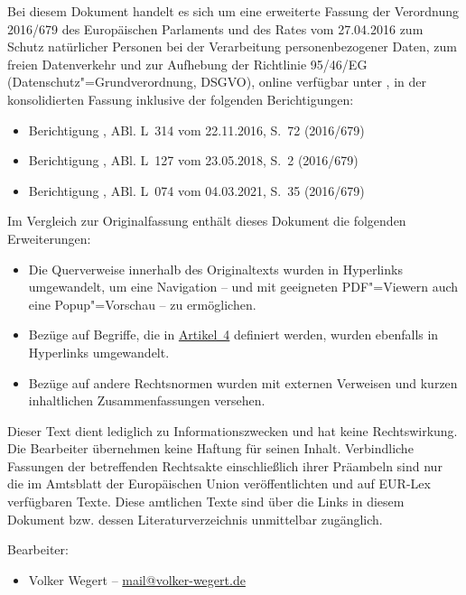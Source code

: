 
Bei diesem Dokument handelt es sich um eine erweiterte Fassung der Verordnung 2016/679 des Europäischen Parlaments und
des Rates vom 27.04.2016 zum Schutz natürlicher Personen bei der Verarbeitung personenbezogener Daten, zum freien
Datenverkehr und zur Aufhebung der Richtlinie 95/46/EG (Datenschutz"=Grundverordnung, DSGVO), online verfügbar unter 
\cite{dsgvo-original}, in der konsolidierten Fassung inklusive der folgenden Berichtigungen:

\begin{itemize}
  \item Berichtigung \cite{dsgvo-korr-2016}, ABl. L~314 vom 22.11.2016, S.~72 (2016/679)
  \item Berichtigung \cite{dsgvo-korr-2018}, ABl. L~127 vom 23.05.2018, S.~2 (2016/679)
  \item Berichtigung \cite{dsgvo-korr-2021}, ABl. L~074 vom 04.03.2021, S.~35 (2016/679)
\end{itemize}

Im Vergleich zur Originalfassung enthält dieses Dokument die folgenden Erweiterungen:

\begin{itemize}

  \item Die Querverweise innerhalb des Originaltexts wurden in Hyperlinks umgewandelt, um eine Navigation -- und
   mit geeigneten PDF"=Viewern auch eine Popup"=Vorschau -- zu ermöglichen.

  \item Bezüge auf Begriffe, die in \hyperref[ch:4]{Artikel~4} definiert werden, wurden ebenfalls in Hyperlinks
   umgewandelt.

  \item Bezüge auf andere Rechtsnormen wurden mit externen Verweisen und kurzen inhaltlichen Zusammenfassungen versehen.

\end{itemize}

Dieser Text dient lediglich zu Informationszwecken und hat keine Rechtswirkung. Die Bearbeiter übernehmen keine Haftung
für seinen Inhalt. Verbindliche Fassungen der betreffenden Rechtsakte einschließlich ihrer Präambeln sind nur die im
Amtsblatt der Europäischen Union veröffentlichten und auf EUR-Lex verfügbaren Texte. Diese amtlichen Texte sind über
die Links in diesem Dokument bzw. dessen Literaturverzeichnis unmittelbar zugänglich.

Bearbeiter:

\begin{itemize}
  \item Volker Wegert -- \href{mailto:mail@volker-wegert.de}{mail@volker-wegert.de}
\end{itemize}